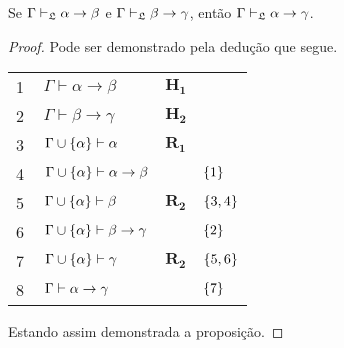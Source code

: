     \begin{tcolorbox}[enhanced jigsaw, breakable, sharp corners, colframe=black, colback=white, boxrule=0.5pt, left=1.5mm, right=1.5mm, top=1.5mm, bottom=1.5mm]
    \begin{lemma}[Composição]\label{composition}
        Se $\Gamma\mathrel{\vdash}_{\mathfrak{L}}\alpha\to\beta$ e $\Gamma\mathrel{\vdash}_{\mathfrak{L}}\beta\to\gamma$, então $\Gamma\mathrel{\vdash}_{\mathfrak{L}}\alpha\to\gamma$.
        \begin{proof}
            Pode ser demonstrado pela dedução que segue.

            \vspace{0.5\baselineskip}
            \footnotesize
            \setlength{\rowskip}{0.5\baselineskip}
            \begin{xltabular}{\textwidth}{r | X l l}
                \scriptsize{\phantom{0}1}\phantom{ } & $\ \Gamma\vdash\alpha\to\beta$                   & $\mathbf{H_1}$\phantom{1}                & \\[\rowskip]
                \scriptsize{\phantom{0}2}\phantom{ } & $\ \Gamma\vdash\beta\to\gamma$                   & $\mathbf{H_2}$                           & \\[\rowskip]
                \scriptsize{\phantom{0}3}\phantom{ } & $\ \Gamma\cup\set{\alpha}\entails\alpha$         & $\hyperref[modal.rule.1]{\mathbf{R_1}}$  & \\[\rowskip]
                \scriptsize{\phantom{0}4}\phantom{ } & $\ \Gamma\cup\set{\alpha}\entails\alpha\to\beta$ &                      & $\left\{1\right\}$\\[\rowskip]
                \scriptsize{\phantom{0}5}\phantom{ } & $\ \Gamma\cup\set{\alpha}\entails\beta$          & $\hyperref[modal.rule.2]{\mathbf{R_2}}$  & $\left\{3,4\right\}$\\
                \scriptsize{\phantom{0}6}\phantom{ } & $\ \Gamma\cup\set{\alpha}\entails\beta\to\gamma$ &                      & $\left\{2\right\}$\\[\rowskip]
                \scriptsize{\phantom{0}7}\phantom{ } & $\ \Gamma\cup\set{\alpha}\entails\gamma$         & $\hyperref[modal.rule.2]{\mathbf{R_2}}$  & $\left\{5,6\right\}$\\[\rowskip]
                \scriptsize{\phantom{0}8}\phantom{ } & $\ \Gamma\entails\alpha\to\gamma$                &                      & $\left\{7\right\}$
            \end{xltabular}
            \normalsize

            \vspace{.5\baselineskip}
            Estando assim demonstrada a proposição.
        \end{proof}
    \end{lemma}
    \end{tcolorbox}

